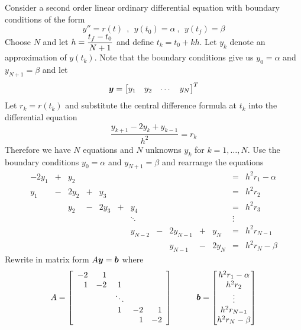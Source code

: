 \begin{example}
Consider a second order linear ordinary differential equation with boundary conditions of the form
$$
y'' = r(t) \ \ , \ \ y(t_0) = \alpha \ , \ \ y(t_f) = \beta
$$
Choose $N$ and let  $\displaystyle h = \frac{t_f - t_0}{N+1}$ and define $t_k = t_0 + kh$. Let $y_k$ denote an approximation of $y(t_k)$. Note that the boundary conditions give us $y_0 = \alpha$ and $y_{N+1} = \beta$ and let
$$
\boldsymbol{y} = \begin{bmatrix} y_1 & y_2 & \cdots & y_N \end{bmatrix}^T
$$
Let $r_k = r(t_k)$ and substitute the central difference formula at $t_k$ into the differential equation
$$
\frac{y_{k+1} -2y_k + y_{k-1}}{h^2} = r_k
$$
Therefore we have $N$ equations and $N$ unknowns $y_k$ for $k=1,\dots,N$. Use the boundary conditions $y_0 = \alpha$ and $y_{N+1} = \beta$ and rearrange the equations
$$
\begin{array}{rrrrrrcrrrrcc}
- 2y_1 & + & y_2 & & & & & & & & & = & h^2 r_1 - \alpha \\
y_1 & - & 2y_2 & + & y_3 & & & & & & & = & h^2 r_2 \\
& & y_2 & - & 2y_3 & + & y_4 & & & & & = & h^2 r_3 \\
& & & & & & \ddots & & & & & \vdots & \\
& & & & & & y_{N-2} & - & 2y_{N-1} & + & y_N & = & h^2 r_{N-1} \\
& & & & & & & & y_{N-1} & - & 2y_N & = & h^2 r_N - \beta
\end{array}
$$
Rewrite in matrix form $A \boldsymbol{y} = \boldsymbol{b}$ where
$$
A =
\left[ \begin{array}{rrcrr}
-2 & 1 & & & \\
1 & -2 & 1 & & \\
& & \ddots & & \\
& & 1 & -2 & 1 \\
& & & 1 & -2
\end{array} \right]
\hspace{10mm}
\bs{b} = 
\begin{bmatrix}
h^2 r_1 - \alpha \\ h^2 r_2 \\ \vdots \\ h^2 r_{N-1} \\ h^2 r_N - \beta
\end{bmatrix}
$$
\end{example}

